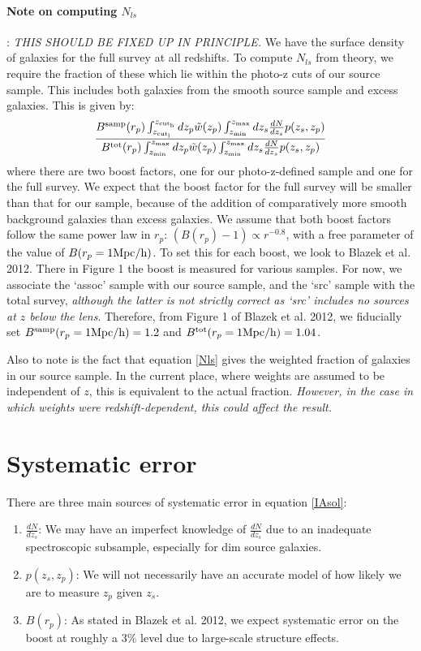 \documentclass[onecolumn,amsmath,aps,fleqn, superscriptaddress]{revtex4}
\begin{document}
\paragraph{Note on computing $N_{ls}$}: {\it THIS SHOULD BE FIXED UP IN PRINCIPLE.} We have the surface density of galaxies for the full survey at all redshifts. To compute $N_{ls}$ from theory, we require the fraction of these which lie within the photo-z cuts of our source sample. This includes both galaxies from the smooth source sample and excess galaxies. This is given by:
\begin{equation}
\frac{B^{\rm samp}(r_p) \int_{z_{\rm cut_l}}^{z_{\rm cut_h}} dz_p \tilde{w}(z_p) \int_{z_{\rm min}}^{z_{\rm max}} dz_s \frac{dN}{dz_s}p(z_s, z_p)}{B^{\rm tot}(r_p) \int_{z_{\rm min}}^{z_{\rm max}} dz_p \tilde{w}(z_p) \int_{z_{\rm min}}^{z_{\rm max}} dz_s \frac{dN}{dz_s}p(z_s, z_p)}
\label{Nls}
\end{equation}
where there are two boost factors, one for our photo-z-defined sample and one for the full survey. We expect that the boost factor for the full survey will be smaller than that for our sample, because of the addition of comparatively more smooth background galaxies than excess galaxies. We assume that both boost factors follow the same power law in $r_p$: $(B(r_p)-1) \propto r^{-0.8}$, with a free parameter of the value of $B(r_p = 1 {\rm Mpc/h})$. To set this for each boost, we look to Blazek et al. 2012. There in Figure 1 the boost is measured for various samples. For now, we associate the `assoc' sample with our source sample, and the `src' sample with the total survey, {\it although the latter is not strictly correct as `src' includes no sources at $z$ below the lens}. Therefore, from Figure 1 of Blazek et al. 2012, we fiducially set $B^{\rm samp}(r_p = 1 {\rm Mpc/h}) = 1.2$ and $B^{\rm tot}(r_p = 1 {\rm Mpc/h}) = 1.04$.

Also to note is the fact that equation \ref{Nls} gives the weighted fraction of galaxies in our source sample. In the current place, where weights are assumed to be independent of $z$, this is equivalent to the actual fraction. {\it However, in the case in which weights were redshift-dependent, this could affect the result.}

\section*{Systematic error}

There are three main sources of systematic error in equation \ref{IAsol}:
\begin{enumerate}
\item{$\frac{dN}{dz_s}$: We may have an imperfect knowledge of $\frac{dN}{dz_s}$ due to an inadequate spectroscopic subsample, especially for dim source galaxies.}
\item{$p(z_s, z_p)$: We will not necessarily have an accurate model of how likely we are to measure $z_p$ given $z_s$.}
\item{$B(r_p)$: As stated in Blazek et al. 2012, we expect systematic error on the boost at roughly a 3\% level due to large-scale structure effects.}
\end{enumerate}
\end{document}
